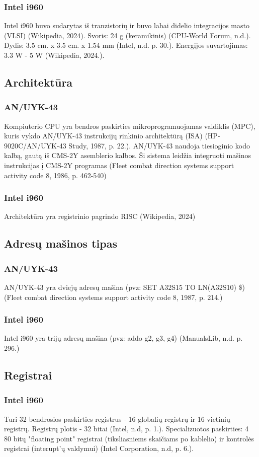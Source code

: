 \documentclass{article}
\begin{document}
\subsubsection{Intel i960}
Intel i960 buvo sudarytas iš tranzistorių ir buvo labai didelio integracijos masto (VLSI) (Wikipedia, 2024). Svoris: 24 g (keramikinis) (CPU-World Forum, n.d.). Dydis: 3.5 cm. x 3.5 cm. x 1.54 mm (Intel, n.d. p. 30.). Energijos suvartojimas: 3.3 W - 5 W (Wikipedia, 2024.).

\subsection{Architektūra}
\subsubsection{AN/UYK-43}
Kompiuterio CPU yra bendros paskirties mikroprogramuojamas valdiklis (MPC), kuris vykdo AN/UYK-43 instrukcijų rinkinio architektūrą (ISA) (HP-9020C/AN/UYK-43 Study, 1987, p. 22.). AN/UYK-43 naudoja tiesioginio kodo kalbą, gautą iš CMS-2Y asemblerio kalbos. Ši sistema leidžia integruoti mašinos instrukcijas į CMS-2Y programas (Fleet combat direction systems support activity code 8, 1986, p. 462-540)
\subsubsection{Intel i960}
Architektūra yra registrinio pagrindo RISC (Wikipedia, 2024)
\subsection{Adresų mašinos tipas}
\subsubsection{AN/UYK-43}
AN/UYK-43 yra dviejų adresų mašina (pvz: SET A32S15 TO LN(A32S10) \$) (Fleet combat direction systems support activity code 8, 1987, p. 214.)
\subsubsection{Intel i960}
Intel i960 yra trijų adresų mašina (pvz: addo g2, g3, g4) (ManualsLib, n.d. p. 296.)
\subsection{Registrai}
\subsubsection{Intel i960}
Turi 32 bendrosios paskirties registrus - 16 globalių registrų ir 16 vietinių registrų. Registrų plotis - 32 bitai (Intel, n.d, p. 1.). Specializuotos paskirties: 4 80 bitų "floating point" registrai (tiksliasniems skaičiams po kablelio) ir kontrolės registrai (interupt'ų valdymui) (Intel Corporation, n.d, p. 6.).
\end{document}
